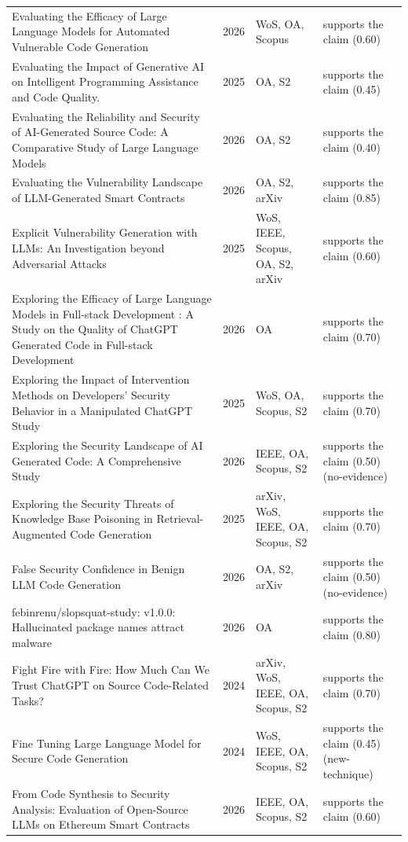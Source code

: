 \begin{longtable}{@{}%
  >{\raggedright\arraybackslash}p{}c%
  >{\raggedright\arraybackslash}p{}%
  >{\raggedright\arraybackslash}p{}@{}}
Evaluating the Efficacy of Large Language Models for Automated Vulnerable Code Generation & 2026 & WoS, OA, Scopus & supports the claim (0.60) \\
Evaluating the Impact of Generative AI on Intelligent Programming Assistance and Code Quality. & 2025 & OA, S2 & supports the claim (0.45) \\
Evaluating the Reliability and Security of AI-Generated Source Code: A Comparative Study of Large Language Models & 2026 & OA, S2 & supports the claim (0.40) \\
Evaluating the Vulnerability Landscape of LLM-Generated Smart Contracts & 2026 & OA, S2, arXiv & supports the claim (0.85) \\
Explicit Vulnerability Generation with LLMs: An Investigation beyond Adversarial Attacks & 2025 & WoS, IEEE, Scopus, OA, S2, arXiv & supports the claim (0.60) \\
Exploring the Efficacy of Large Language Models in Full-stack Development : A Study on the Quality of ChatGPT Generated Code in Full-stack Development & 2026 & OA & supports the claim (0.70) \\
Exploring the Impact of Intervention Methods on Developers' Security Behavior in a Manipulated ChatGPT Study & 2025 & WoS, OA, Scopus, S2 & supports the claim (0.70) \\
Exploring the Security Landscape of AI Generated Code: A Comprehensive Study & 2026 & IEEE, OA, Scopus, S2 & supports the claim (0.50) (no-evidence) \\
Exploring the Security Threats of Knowledge Base Poisoning in Retrieval-Augmented Code Generation & 2025 & arXiv, WoS, IEEE, OA, Scopus, S2 & supports the claim (0.70) \\
False Security Confidence in Benign LLM Code Generation & 2026 & OA, S2, arXiv & supports the claim (0.50) (no-evidence) \\
febinrenu/slopsquat-study: v1.0.0: Hallucinated package names attract malware & 2026 & OA & supports the claim (0.80) \\
Fight Fire with Fire: How Much Can We Trust ChatGPT on Source Code-Related Tasks? & 2024 & arXiv, WoS, IEEE, OA, Scopus, S2 & supports the claim (0.70) \\
Fine Tuning Large Language Model for Secure Code Generation & 2024 & WoS, IEEE, OA, Scopus, S2 & supports the claim (0.45) (new-technique) \\
From Code Synthesis to Security Analysis: Evaluation of Open-Source LLMs on Ethereum Smart Contracts & 2026 & IEEE, OA, Scopus, S2 & supports the claim (0.60) \\

\end{longtable}
